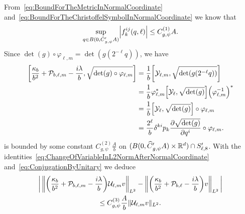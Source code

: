 \documentclass[AHL,Unicode,longabstracts]{cedram}
\newcommand{\R}{\mathbb{R}}
\newcommand{\clY}{\mathcal{Y}}
\newcommand{\clP}{\mathcal{P}}
\newcommand{\clU}{\mathcal{U}}
\let\oldhat\hat
\renewcommand*{\hat}[1]{\mathchoice{\widehat{#1}}{\widehat{#1}}{\oldhat{#1}}{\oldhat{#1}}}
\let\originalleft\left
\let\originalright\right
\renewcommand{\left}{\mathopen{}\mathclose\bgroup\originalleft}
\renewcommand{\right}{\aftergroup\egroup\originalright}
\begin{document}
From~\eqref{eq:BoundForTheMetricInNormalCoordinate} and~\eqref{eq:BoundForTheChristoffelSymbolInNormalCoordinate} we know that
\begin{equation}\label{eq:BoundForfijk}
\sup_{q\in B(0,\hat{C}'_{g,\psi}A)} \left|f_{k}^{ij}(q,\ell)\right| \leq C_{g,\psi}^{(1)}A .
\end{equation}
Since $\det (g)\circ \varphi_{\ell,m} = \det (g(2^{-\ell}q)) $, we have
\begin{equation}\label{eq:ErrorAfterCommutingWithTheJacobian}
\begin{aligned}[t] \left[\frac{\kappa_{b}}{b^{2}} + \clP_{b,\ell,m}-\frac{i\lambda}{b},\sqrt{\det (g)\circ\varphi_{\ell,m}}\right]
&= \frac{1}{b}\left[\clY_{\ell,m}, \sqrt{\det (g(2^{-\ell}q))} \right] \\
&= \frac{1}{b}\varphi_{\ell,m}^{*}\left[\clY_{\ell},\sqrt{\det (g)}\right] \left(\varphi^{-1}_{\ell,m}\right)^{*} \\
 &= \frac{1}{b}\left[\clY_{\ell}, \sqrt{\det (g)}\right]\circ \varphi_{\ell,m}\\
&= \frac{2^{\ell}}{b}\delta^{ki}p_{k} \frac{\partial \sqrt{\det (g)}}{\partial q^{i}}\circ \varphi_{\ell,m}. 
\end{aligned}
\end{equation}
is bounded by some constant $C_{g,\psi}^{(2)}\frac{A}{b}$ on $(B(0,\hat{C}'_{g,\psi}A)\times \R^d) \cap S_{\ell,8}'$. With the identities~\eqref{eq:ChangeOfVariableInL2NormAfterNormalCoordinate} and~\eqref{eq:ConjugationByUnitary} we deduce
\begin{multline}\label{eq:BoundForTheEquivalenceAfterChangeOfVariableVarphi}
\left|\,\left\| \left(\frac{\kappa_{b}}{b^{2}}+\clP_{b,\ell,m} - \frac{i\lambda}{b}\right)\clU_{\ell,m} v\right\|_{L^2} - \left\| \left(\frac{\kappa_{b}}{b^{2}} + \clP_{b,\ell} - \frac{i\lambda}{b}\right)v \right\|_{L^2}\,\right|\\ \leq C_{g,\psi}^{(3)}\frac{A}{b}\| \clU_{\ell,m} v\|_{L^2}.
\end{multline}
\end{document}
